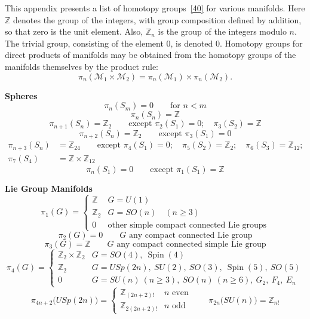 
\label{app:23.B}

This appendix presents a list of homotopy groups~\hyperref[ch23-ref-40]{[40]}
for various manifolds. Here $\mathbb{Z}$ denotes the group of the integers,
with group composition defined by addition, so that zero is the unit element.
Also, $\mathbb{Z}_n$ is the group of the integers modulo $n$. The trivial
group, consisting of the element 0, is denoted 0. Homotopy groups for direct
products of manifolds may be obtained from the homotopy groups of the
manifolds themselves by the product rule:
\[
 \pi_n(\mathcal M_1\times\mathcal M_2)
 =\pi_n(\mathcal M_1)\times\pi_n(\mathcal M_2).
\]

\medskip
\noindent\textbf{Spheres}
\[
 \pi_n(S_m)=0\qquad\text{for }n<m
\]
\[
 \pi_n(S_n)=\mathbb{Z}
\]
\[
 \pi_{n+1}(S_n)=\mathbb{Z}_2
 \qquad\text{except }\pi_2(S_1)=0;\quad\pi_3(S_2)=\mathbb{Z}
\]
\[
 \pi_{n+2}(S_n)=\mathbb{Z}_2
 \qquad\text{except }\pi_3(S_1)=0
\]
\[
 \begin{aligned}
 \pi_{n+3}(S_n)&=\mathbb{Z}_{24}
 \qquad\text{except }\pi_4(S_1)=0;\quad
 \pi_5(S_2)=\mathbb{Z}_2;\quad\pi_6(S_3)=\mathbb{Z}_{12};\\
 \pi_7(S_4)&=\mathbb{Z}\times\mathbb{Z}_{12}
 \end{aligned}
\]
\[
 \pi_n(S_1)=0\qquad\text{except }\pi_1(S_1)=\mathbb{Z}
\]

\medskip
\noindent\textbf{Lie Group Manifolds}
\[
 \pi_1(G)=
 \begin{cases}
  \mathbb{Z}   & G=U(1)\\
  \mathbb{Z}_2 & G=SO(n)\quad(n\geq3)\\
  0            & \text{other simple compact connected Lie groups}
 \end{cases}
\]
\[
 \pi_2(G)=0\qquad G\text{ any compact connected Lie group}
\]
\[
 \pi_3(G)=\mathbb{Z}\qquad
 G\text{ any compact connected simple Lie group}
\]
\[
 \pi_4(G)=
 \begin{cases}
  \mathbb{Z}_2\times\mathbb{Z}_2
    & G=SO(4),\ \operatorname{Spin}(4)\\
  \mathbb{Z}_2
    & G=USp(2n),\ SU(2),\ SO(3),\ \operatorname{Spin}(5),\ SO(5)\\
  0
    & G=SU(n)\ (n\geq3),\ SO(n)\ (n\geq6),\ G_2,\ F_4,\ E_n
 \end{cases}
\]
\[
 \pi_{4n+2}\bigl(USp(2n)\bigr)=
 \begin{cases}
  \mathbb{Z}_{(2n+2)!}  & n\text{ even}\\
  \mathbb{Z}_{2(2n+2)!} & n\text{ odd}
 \end{cases}
 \qquad
 \pi_{2n}\bigl(SU(n)\bigr)=\mathbb{Z}_{n!}
\]

